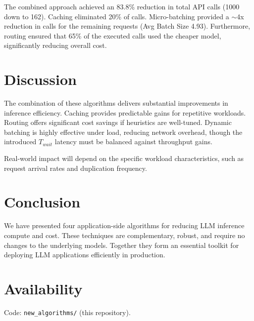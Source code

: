 \documentclass[11pt]{article}
\begin{document}
The combined approach achieved an 83.8\% reduction in total API calls (1000 down to 162). Caching eliminated 20\% of calls. Micro-batching provided a $\sim$4x reduction in calls for the remaining requests (Avg Batch Size 4.93). Furthermore, routing ensured that 65\% of the executed calls used the cheaper model, significantly reducing overall cost.

\section{Discussion}
The combination of these algorithms delivers substantial improvements in inference efficiency. Caching provides predictable gains for repetitive workloads. Routing offers significant cost savings if heuristics are well-tuned. Dynamic batching is highly effective under load, reducing network overhead, though the introduced $T_{wait}$ latency must be balanced against throughput gains.

Real-world impact will depend on the specific workload characteristics, such as request arrival rates and duplication frequency.

\section{Conclusion}
We have presented four application-side algorithms for reducing LLM inference compute and cost. These techniques are complementary, robust, and require no changes to the underlying models. Together they form an essential toolkit for deploying LLM applications efficiently in production.

\section*{Availability}
Code: \texttt{new\_algorithms/} (this repository).
\end{document}
